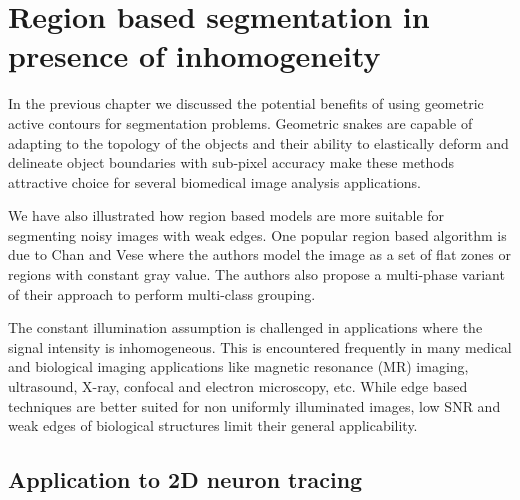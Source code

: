 \chapter{Region based segmentation in presence of inhomogeneity} %
\label{L2S_Ch} %


In the previous chapter we discussed the potential benefits of using geometric active contours for segmentation problems. Geometric snakes are capable of adapting to the topology of the objects and  their ability to elastically deform and delineate object boundaries with sub-pixel accuracy make these methods attractive choice for several biomedical image analysis applications. 

We have also illustrated how region based models are more suitable for segmenting noisy images with weak edges. One popular region based algorithm is due to Chan and Vese\cite{chan_vese} where the authors model the image as a set of flat zones or regions with constant gray value. The authors also propose a multi-phase variant \cite{vese_multiphase} of their approach to perform multi-class grouping. 

The constant illumination assumption is challenged in applications where the signal intensity is inhomogeneous. This is encountered frequently in many medical and biological imaging applications like magnetic resonance (MR) imaging, ultrasound, X-ray, confocal and electron microscopy, etc. While edge based techniques are better suited for non uniformly illuminated images, low SNR and weak edges of biological structures limit their general applicability.

\section{Application to 2D neuron tracing}

